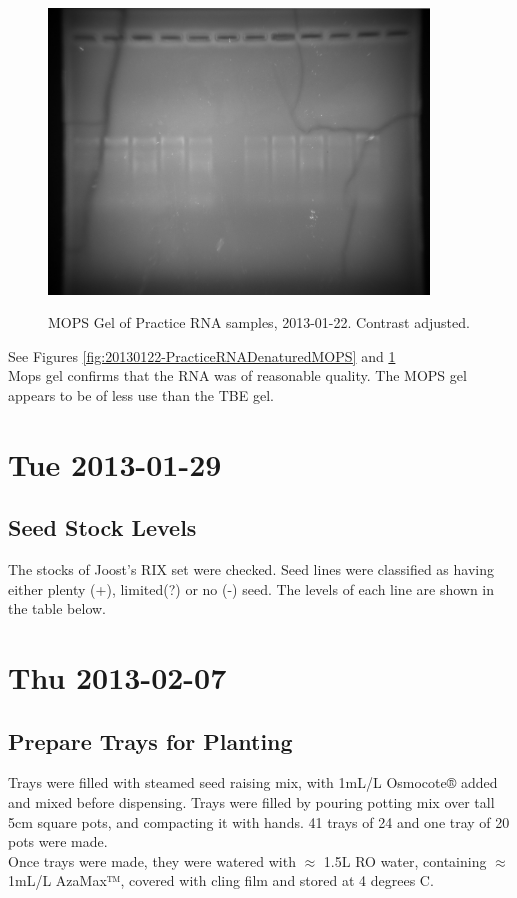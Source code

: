 \documentclass[12pt,a4paper]{book}
\begin{document}
      \begin{figure}[h!]
        \caption{MOPS Gel of Practice RNA samples, 2013-01-22. Contrast adjusted.}
        \centering
          \includegraphics[width=0.9\textwidth]{./jan/20130122-PracticeRNADenaturedMOPS-HighContrast}
        \label{fig:20130122-PracticeRNADenaturedMOPS-HighContrast}
      \end{figure}

      See Figures \ref{fig:20130122-PracticeRNADenaturedMOPS} and
      \ref{fig:20130122-PracticeRNADenaturedMOPS-HighContrast}\\
      Mops gel confirms that the RNA was of reasonable quality. The MOPS gel appears to be of less use than the TBE
      gel.\\

\chapter*{Tue 2013-01-29}
  \section*{Seed Stock Levels}
    The stocks of Joost's RIX set were checked. Seed lines were classified as having either plenty
    (+), limited(?) or no (-) seed. The levels of each line are shown in the table below.

\chapter*{Thu 2013-02-07}
  \section*{Prepare Trays for Planting}
    Trays were filled with steamed seed raising mix, with 1mL/L Osmocote® added and mixed before
    dispensing. Trays were filled by pouring potting mix over tall 5cm square pots, and compacting
    it with hands. 41 trays of 24 and one tray of 20 pots were made.\\
    Once trays were made, they were watered with $\approx$ 1.5L RO water, containing $\approx$ 1mL/L
    AzaMax™, covered with cling film and stored at 4 degrees C.
\end{document}
